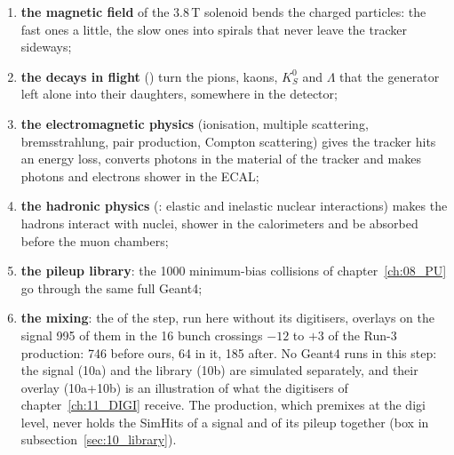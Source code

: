 \begin{enumerate}
\item \textbf{the magnetic field} of the $3.8$\,T solenoid bends the charged particles: the fast ones a little,
the slow ones into spirals that never leave the tracker sideways;
\item \textbf{the decays in flight} () turn the pions, kaons, $K^0_S$ and $\Lambda$ that the
generator left alone into their daughters, somewhere in the detector;
\item \textbf{the electromagnetic physics} (ionisation, multiple scattering, bremsstrahlung, pair production,
Compton scattering) gives the tracker hits an energy loss, converts photons in the material of the tracker and makes
photons and electrons shower in the ECAL;
\item \textbf{the hadronic physics} (: elastic and inelastic nuclear interactions) makes the
hadrons interact with nuclei, shower in the calorimeters and be absorbed before the muon chambers;
\item \textbf{the pileup library}: the 1000 minimum-bias collisions of chapter~\ref{ch:08_PU} go through the same
full Geant4;
\item \textbf{the mixing}: the  of the  step, run here without its digitisers,
overlays on the signal 995 of them in the 16 bunch crossings $-12$ to $+3$ of the Run-3 production: 746 before ours,
64 in it, 185 after. No Geant4 runs in this step: the signal (10a) and the library (10b) are simulated separately,
and their overlay (10a+10b) is an illustration of what the digitisers of chapter~\ref{ch:11_DIGI} receive. The
production, which premixes at the digi level, never holds the SimHits of a signal and of its pileup together (box in
subsection~\ref{sec:10_library}).
\end{enumerate}

